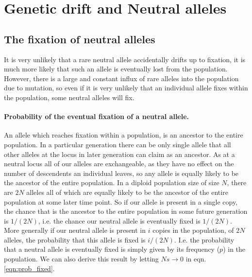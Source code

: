\section{Genetic drift and Neutral alleles}



\subsection{The fixation of neutral alleles}
It is very unlikely that a rare neutral allele accidentally drifts up
to fixation, it is much more likely that such an allele is eventually
lost from the population. However, there is a large and constant influx of
rare alleles into the population due to mutation, so even if it is very
unlikely that an individual allele fixes within the population, some
neutral alleles will fix.  \\




\paragraph{Probability of the eventual fixation of a neutral allele.} An allele which reaches fixation within a population, is an ancestor to
the entire population. In a particular generation there can be only single
allele that all other alleles at the locus in  later generation can claim as an
ancestor. As at a neutral locus all of our alleles are exchangeable, as
they have no effect on the number of descendents an individual
leaves, so any allele is equally likely to be the ancestor of the
entire population.  In a diploid population size of size $N$, there are $2N$
alleles all of which are equally likely to be the ancestor of the
entire population at some later time point. So if our allele is present in a single copy, the chance that
is the ancestor to the entire population in some future generation is
$1/(2N)$, i.e. the chance our neutral allele is eventually fixed is
$1/(2N)$.\\

More generally if our neutral allele is present in $i$ copies in the
population, of $2N$ alleles, the probability that this allele is fixed
is $i/(2N)$. I.e. the probability that a neutral allele is eventually
fixed is simply given by its frequency ($p$) in the population.
We can also derive this result by letting $Ns \rightarrow
0$ in eqn. \eqref{eqn:prob_fixed}.

